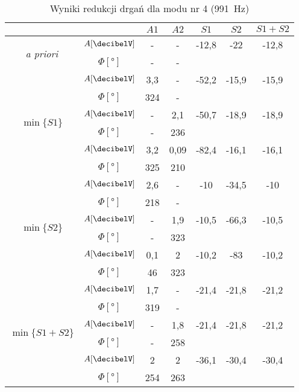 \documentclass[polish,a4paper,11pt]{mwart}
\begin{document}
  \begin{table}[!tbh]
    \centering
    \caption{Wyniki redukcji drgań dla modu nr 4 (\SI{991}{\hertz})}
    \label{tab:red4}
    \begin{tabular}{|c|c|c|c|c|c|c|}
      \cline{3-7}
      \multicolumn{2}{c|}{}&$A1$&$A2$&$S1$&$S2$&$S1+S2$\\\hline
      \multirow{2}{*}{\textit{a priori}} & $A [\si{\decibelV}]$ & - & - & -12,8 & -22 & -12,8\\\cline{2-7}
					 & $\Phi [\si{\degree}]$ & - & - & \multicolumn{3}{c}{}\\\hline
      \multirow{6}{*}{$\min\{S1\}$}   &   $A [\si{\decibelV}]$ & 3,3 & - & -52,2 & -15,9 & -15,9\\\cline{2-7}
				      &$\Phi [\si{\degree}]$ & 324 & - & \multicolumn{3}{c}{}\\\cline{2-7}
				      &   $A [\si{\decibelV}]$ & - & 2,1 & -50,7 & -18,9 & -18,9\\\cline{2-7}
				      &$\Phi [\si{\degree}]$ & - & 236 & \multicolumn{3}{c}{}\\\cline{2-7}
				      &   $A [\si{\decibelV}]$ & 3,2 & 0,09 & -82,4 & -16,1 & -16,1\\\cline{2-7}
				      &$\Phi [\si{\degree}]$ & 325 & 210 & \multicolumn{3}{c}{}\\\hline
      \multirow{6}{*}{$\min\{S2\}$}   &   $A [\si{\decibelV}]$ & 2,6 & - & -10 & -34,5 & -10\\\cline{2-7}
				      &$\Phi [\si{\degree}]$ & 218 & - & \multicolumn{3}{c}{}\\\cline{2-7}
				      &   $A [\si{\decibelV}]$ & - & 1,9 & -10,5 & -66,3 & -10,5\\\cline{2-7}
				      &$\Phi [\si{\degree}]$ & - & 323 & \multicolumn{3}{c}{}\\\cline{2-7}
				      &   $A [\si{\decibelV}]$ & 0,1 & 2 & -10,2 & -83 & -10,2\\\cline{2-7}
				      &$\Phi [\si{\degree}]$ & 46 & 323 & \multicolumn{3}{c}{}\\\hline
      \multirow{6}{*}{$\min\{S1+S2\}$}&   $A [\si{\decibelV}]$ & 1,7 & - & -21,4 & -21,8 & -21,2\\\cline{2-7}
				      &$\Phi [\si{\degree}]$ & 319 & - & \multicolumn{3}{c}{}\\\cline{2-7}
				      &   $A [\si{\decibelV}]$ & - & 1,8 & -21,4 & -21,8 & -21,2\\\cline{2-7}
				      &$\Phi [\si{\degree}]$ & - & 258 & \multicolumn{3}{c}{}\\\cline{2-7}
				      &   $A [\si{\decibelV}]$ & 2 & 2 & -36,1 & -30,4 & -30,4\\\cline{2-7}
				      &$\Phi [\si{\degree}]$ & 254 & 263 & \multicolumn{3}{c}{}\\\cline{1-4}
    \end{tabular}
  \end{table}
\end{document}
